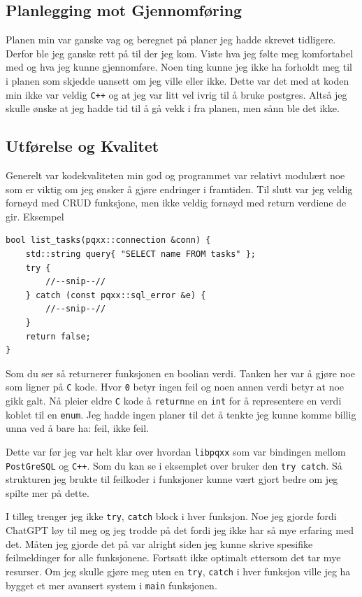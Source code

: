 \documentclass{article}
\begin{document}
\subsection{Planlegging mot Gjennomføring}
Planen min var ganske vag og beregnet på planer jeg hadde skrevet tidligere. Derfor ble jeg ganske rett på til der jeg kom. Viste hva jeg følte meg komfortabel med og hva jeg kunne gjennomføre. Noen ting kunne jeg ikke ha forholdt meg til i planen som skjedde uansett om jeg ville eller ikke. Dette var det med at koden min ikke var veldig \lstinline{C++} og at jeg var litt vel ivrig til å bruke postgres. Altså jeg skulle ønske at jeg hadde tid til å gå vekk i fra planen, men sånn ble det ikke.
\subsection{Utførelse og Kvalitet}
Generelt var kodekvaliteten min god og programmet var relativt modulært noe som er viktig om jeg ønsker å gjøre endringer i framtiden. Til slutt var jeg veldig fornøyd med CRUD funksjone, men ikke veldig fornøyd med return verdiene de gir. Eksempel
\begin{lstlisting}
bool list_tasks(pqxx::connection &conn) {
    std::string query{ "SELECT name FROM tasks" };
    try {
        //--snip--//
    } catch (const pqxx::sql_error &e) {
        //--snip--//
    }
    return false;
}
\end{lstlisting}
Som du ser så returnerer funksjonen en boolian verdi. Tanken her var å gjøre noe som ligner på \lstinline{C} kode. Hvor \lstinline{0} betyr ingen feil og noen annen verdi betyr at noe gikk galt. Nå pleier eldre \lstinline{C} kode å \lstinline{return}ne en \lstinline{int} for å representere en verdi koblet til en \lstinline{enum}. Jeg hadde ingen planer til det å tenkte jeg kunne komme billig unna ved å bare ha: feil, ikke feil. 

Dette var før jeg var helt klar over hvordan \lstinline{libpqxx} som var bindingen mellom \lstinline{PostGreSQL} og \lstinline{C++}. Som du kan se i eksemplet over bruker den \lstinline{try catch}. Så strukturen jeg brukte til feilkoder i funksjoner kunne vært gjort bedre om jeg spilte mer på dette. 

I tilleg trenger jeg ikke \lstinline{try}, \lstinline{catch} block i hver funksjon. Noe jeg gjorde fordi ChatGPT løy til meg og jeg trodde på det fordi jeg ikke har så mye erfaring med det. Måten jeg gjorde det på var alright siden jeg kunne skrive spesifike feilmeldinger for alle funksjonene. Fortsatt ikke optimalt ettersom det tar mye resurser. Om jeg skulle gjøre meg uten en \lstinline{try}, \lstinline{catch} i hver funksjon ville jeg ha bygget et mer avansert system i \lstinline{main} funksjonen.
\end{document}
